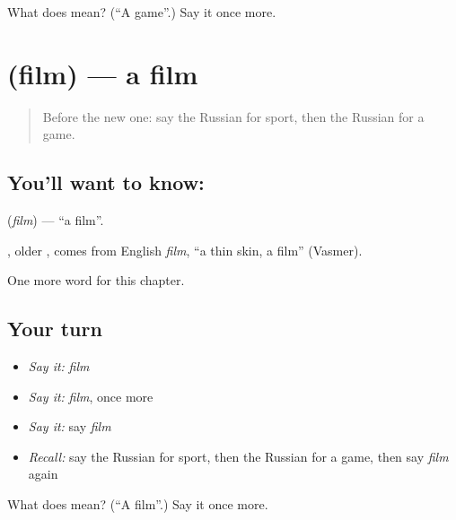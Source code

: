 \begin{tcolorbox}[breakable,colback=teal!4,colframe=teal!35!black,title={Before you move on}]
What does  mean? (\textquotedblleft{}A game\textquotedblright{}.) Say it once more.
\end{tcolorbox}
\section[\texorpdfstring{\ru{фильм} (film)}{фильм (film)}]{ (film) — a film}

\label{lesson:RU-C113-film}



\begin{quote}
Before the new one: say the Russian for sport, then the Russian for a game.
\end{quote}

\subsection*{You'll want to know: }
\textbf{} (\emph{film}) — \textquotedblleft{}a film\textquotedblright{}.

\begin{cousinweb}
\textbf{}, older \emph{}, comes from English \emph{film}, \textquotedblleft{}a thin skin, a film\textquotedblright{} (Vasmer).
\end{cousinweb}

\begin{grammarlens}[title={What you've built}]
One more word for this chapter.
\end{grammarlens}

\subsection*{Your turn}
\begin{itemize}
\raggedright
  \item \emph{Say it:} \emph{film}
  \item \emph{Say it:} \emph{film}, once more
  \item \emph{Say it:} say \emph{film}
  \item \emph{Recall:} say the Russian for sport, then the Russian for a game, then say \emph{film} again
\end{itemize}

\begin{tcolorbox}[breakable,colback=teal!4,colframe=teal!35!black,title={Before you move on}]
What does  mean? (\textquotedblleft{}A film\textquotedblright{}.) Say it once more.
\end{tcolorbox}

